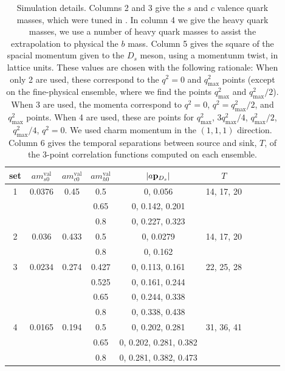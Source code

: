 \begin{table}[htb!]
  \begin{center}
    \begin{tabular}{c c c c c c c c c c}
      \hline
      set & $am_{s0}^{\text{val}}$ & $am_{c0}^{\text{val}}$ & $am^{\text{val}}_{h0}$ & $|a{\bf{p}}_{D_s}|$ & $T$ \\ [0.5ex]
      \hline
      1 & 0.0376 & 0.45
      & 0.5 & 0, 0.056 & 14, 17, 20 \\ [1ex]
      & & & 0.65 & 0, 0.142, 0.201 &  \\ [1ex]
      & & & 0.8 & 0, 0.227, 0.323 &  \\ [1ex]

      \hline
      2 & 0.036 & 0.433
      & 0.5 & 0, 0.0279 & 14, 17, 20 \\ [1ex]
      & & & 0.8 & 0, 0.162  & \\ [1ex]

      \hline
      3 & 0.0234 & 
      0.274 & 0.427 & 0, 0.113, 0.161 & 22, 25, 28 \\ [1ex]
      & & & 0.525 & 0, 0.161, 0.244 & \\ [1ex]
      & & & 0.65 & 0, 0.244, 0.338 & \\ [1ex]
      & & & 0.8 & 0, 0.338, 0.438 & \\ [1ex]

      \hline
      4 & 0.0165 
      & 0.194 & 0.5 & 0, 0.202, 0.281 & 31, 36, 41 \\ [1ex]
      & & & 0.65 & 0, 0.202, 0.281, 0.382 & \\ [1ex]
      & & & 0.8 & 0, 0.281, 0.382, 0.473 & \\ [1ex]
      \hline
    \end{tabular}
  \end{center}
  \caption{Simulation details. Columns 2 and 3 give the $s$ and $c$ valence quark masses, which were tuned in \cite{Chakraborty:2014aca}. In column 4 we give the heavy quark masses, we use a number of heavy quark masses to assist the extrapolation to physical the $b$ mass. Column 5 gives the square of the spacial momentum given to the $D_s$ meson, using a momentunm twist, in lattice units. These values are chosen with the following rationale: When only 2 are used, these correspond to the $q^2=0$ and $q^2_{\text{max}}$ points (except on the fine-physical ensemble, where we find the points $q^2_{\text{max}}$ and $q^2_{\text{max}}/2$). When 3 are used, the momenta correspond to $q^2=0$, $q^2=q^2_{\text{max}}/2$, and $q^2_{\text{max}}$ points. When 4 are used, these are points for $q^2_{\text{max}}$, $3q^2_{\text{max}}/4$, $q^2_{\text{max}}/2$, $q^2_{\text{max}}/4$, $q^2=0$. We used charm momentum in the $(1,1,1)$ direction. Column 6 gives the temporal separations between source and sink, $T$, of the 3-point correlation functions computed on each ensemble.}
  \label{tab:simulation}
\end{table}

